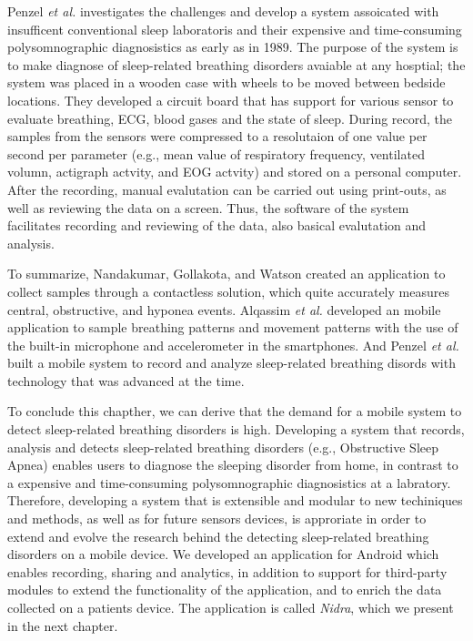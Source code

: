 Penzel \textit{et al.} \cite{mobilesleeplab} investigates the challenges and develop a system assoicated with insufficent conventional sleep laboratoris and their expensive and time-consuming polysomnographic diagnosistics as early as in 1989. The purpose of the system is to make diagnose of sleep-related breathing disorders avaiable at any hosptial; the system was placed in a wooden case with wheels to be moved between bedside locations. They developed a circuit board that has support for various sensor to evaluate breathing, ECG, blood gases and the state of sleep. During record, the samples from the sensors were compressed to a resolutaion of one value per second per parameter (e.g., mean value of respiratory frequency, ventilated volumn, actigraph actvity, and EOG actvity) and stored on a personal computer. After the recording, manual evalutation can be carried out using print-outs, as well as reviewing the data on a screen. Thus, the software of the system facilitates recording and reviewing of the data, also basical evalutation and analysis. 

To summarize, Nandakumar, Gollakota, and Watson created an application to collect samples through a contactless solution, which quite accurately measures central, obstructive, and hyponea events. Alqassim \textit{et al.} developed an mobile application to sample breathing patterns and movement patterns with the use of the built-in microphone and accelerometer in the smartphones. And Penzel \textit{et al.} built a mobile system to record and analyze sleep-related breathing disords with technology that was advanced at the time.

To conclude this chapther, we can derive that the demand for a mobile system to detect sleep-related breathing disorders is high. Developing a system that records, analysis and detects sleep-related breathing disorders (e.g., Obstructive Sleep Apnea) enables users to diagnose the sleeping disorder from home, in contrast to a expensive and time-consuming polysomnographic diagnosistics at a labratory. Therefore, developing a system that is extensible and modular to new techiniques and methods, as well as for future sensors devices, is approriate in order to extend and evolve the research behind the detecting sleep-related breathing disorders on a mobile device. We developed an application for Android which enables recording, sharing and analytics, in addition to support for third-party modules to extend the functionality of the application, and to enrich the data collected on a patients device. The application is called \textit{Nidra}, which we present in the next chapter. 

